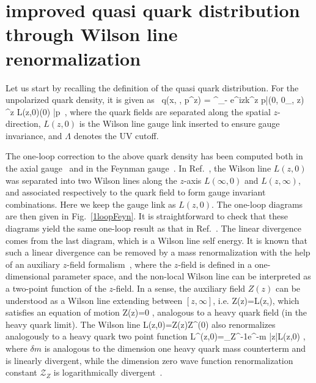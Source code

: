 \section{improved quasi quark distribution through Wilson line renormalization}
Let us start by recalling the definition of the quasi quark distribution. For the unpolarized quark density, it is given as~\cite{Ji:2013dva}
\beq\label{qUnpolDef}
   \tilde q(x, \Lambda, p^z) = \int^\infty_{-\infty}  e^{izk^z}  \langle p|\overline{\psi}(0, 0_\perp, z)
   \gamma^z L(z,0)\psi(0) |p\rangle \ ,
\eeq
where the quark fields are separated along the spatial $z$-direction, $L(z,0)$ is the Wilson line gauge link inserted to ensure gauge invariance, and $\Lambda$ denotes the UV cutoff.

The one-loop correction to the above quark density has been computed both in the axial gauge~\cite{Xiong:2013bka} and in the Feynman gauge~\cite{Ji:2015jwa}. In Ref.~\cite{Ji:2015jwa}, the Wilson line $L(z,0)$ was separated into two Wilson lines along the $z$-axis $L(\infty,0)$ and $L(z,\infty)$, and associated respectively to the quark field to form gauge invariant combinations. Here we keep the gauge link as $L(z,0)$. The one-loop diagrams are then given in Fig.~\ref{1loopFeyn}. It is straightforward to check that these diagrams yield the same one-loop result as that in Ref.~\cite{Ji:2015jwa}. The linear divergence comes from the last diagram, which is a Wilson line self energy. It is known that such a linear divergence can be removed by a mass renormalization with the help of an auxiliary $z$-field formalism~\cite{Dotsenko:1979wb,Dorn:1986dt,Craigie:1980qs}, where the $z$-field is defined in a one-dimensional parameter space, and the non-local Wilson line can be interpreted as a two-point function of the $z$-field. In a sense, the auxiliary field $Z(z)$ can be understood as a Wilson line extending between $[z,\infty]$, i.e.
\beq
Z(z)=L(z,\infty),
\eeq
which satisfies an equation of motion 
\beq
{}Z(z)=0 ,
\eeq
analogous to a heavy quark field (in the heavy quark limit).   
The Wilson line 
\beq
L(z,0)=Z(z)Z^{\dagger}(0) 
\eeq
also renormalizes analogously to a heavy quark two point function 
\beq\label{WLrenorm}
L^{}(z,0)=_Z^{-1}e^{-\delta m |z|}L(z,0) ,
\eeq
where $\delta m$ is analogous to the dimension one heavy quark mass counterterm and is linearly divergent, while the dimension zero wave function renormalization constant $\mathcal{Z}_Z$ is logarithmically divergent~\cite{Dotsenko:1979wb}. 


